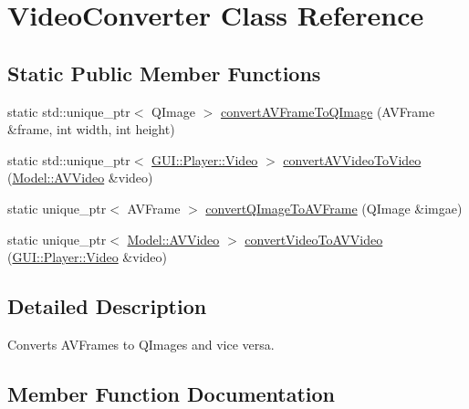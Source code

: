 \hypertarget{classUtility_1_1VideoConverter}{}\section{Video\+Converter Class Reference}
\label{classUtility_1_1VideoConverter}
\subsection*{Static Public Member Functions}
\begin{DoxyCompactItemize}
\item 
static std\+::unique\+\_\+ptr$<$ Q\+Image $>$ \hyperlink{classUtility_1_1VideoConverter_a78d44935ccf132db2ad8ae0ba954f535}{convert\+A\+V\+Frame\+To\+Q\+Image} (A\+V\+Frame \&frame, int width, int height)
\item 
static std\+::unique\+\_\+ptr$<$ \hyperlink{classGUI_1_1Player_1_1Video}{G\+U\+I\+::\+Player\+::\+Video} $>$ \hyperlink{classUtility_1_1VideoConverter_ab6f57d7b36e24d6e49599916edb5612a}{convert\+A\+V\+Video\+To\+Video} (\hyperlink{classModel_1_1AVVideo}{Model\+::\+A\+V\+Video} \&video)
\item 
static unique\+\_\+ptr$<$ A\+V\+Frame $>$ \hyperlink{classUtility_1_1VideoConverter_a7d731d86e559fddb8bd389128a7d03c2}{convert\+Q\+Image\+To\+A\+V\+Frame} (Q\+Image \&imgae)
\item 
static unique\+\_\+ptr$<$ \hyperlink{classModel_1_1AVVideo}{Model\+::\+A\+V\+Video} $>$ \hyperlink{classUtility_1_1VideoConverter_a4a753153a0f3b4c9ef80b8b2820159a3}{convert\+Video\+To\+A\+V\+Video} (\hyperlink{classGUI_1_1Player_1_1Video}{G\+U\+I\+::\+Player\+::\+Video} \&video)
\end{DoxyCompactItemize}


\subsection{Detailed Description}
Converts A\+V\+Frames to Q\+Images and vice versa. 

\subsection{Member Function Documentation}
\hypertarget{classUtility_1_1VideoConverter_a78d44935ccf132db2ad8ae0ba954f535}{}
